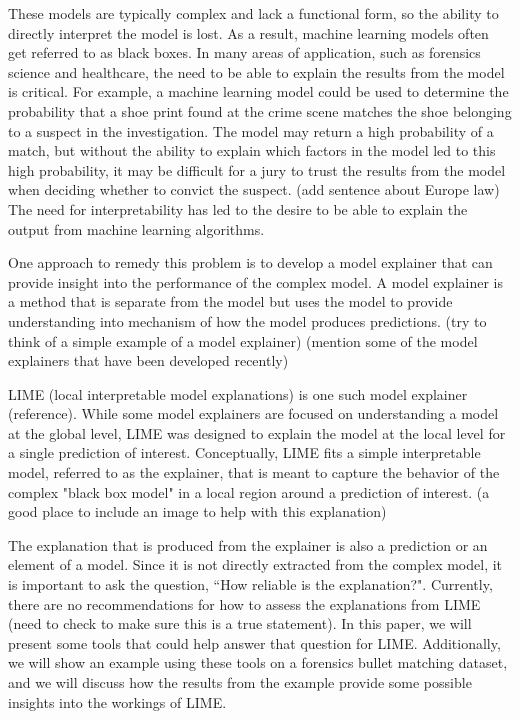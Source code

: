 \documentclass[AMS,STIX2COL]{WileyNJD-v2}
\begin{document}
These models are typically complex and lack a functional form, so the ability to directly interpret the model is lost. As a result, machine learning models often get referred to as black boxes. In many areas of application, such as forensics science and healthcare, the need to be able to explain the results from the model is critical. For example, a machine learning model could be used to determine the probability that a shoe print found at the crime scene matches the shoe belonging to a suspect in the investigation. The model may return a high probability of a match, but without the ability to explain which factors in the model led to this high probability, it may be difficult for a jury to trust the results from the model when deciding whether to convict the suspect. (add sentence about Europe law) The need for interpretability has led to the desire to be able to explain the output from machine learning algorithms.

One approach to remedy this problem is to develop a model explainer that can provide insight into the performance of the complex model. A model explainer is a method that is separate from the model but uses the model to provide understanding into mechanism of how the model produces predictions. (try to think of a simple example of a model explainer) (mention some of the model explainers that have been developed recently)

LIME (local interpretable model explanations) is one such model explainer (reference). While some model explainers are focused on understanding a model at the global level, LIME was designed to explain the model at the local level for a single prediction of interest. Conceptually, LIME fits a simple interpretable model, referred to as the explainer, that is meant to capture the behavior of the complex "black box model" in a local region around a prediction of interest. (a good place to include an image to help with this explanation)

The explanation that is produced from the explainer is also a prediction or an element of a model. Since it is not directly extracted from the complex model, it is important to ask the question, ``How reliable is the explanation?". Currently, there are no recommendations for how to assess the explanations from LIME (need to check to make sure this is a true statement). In this paper, we will present some tools that could help answer that question for LIME. Additionally, we will show an example using these tools on a forensics bullet matching dataset, and we will discuss how the results from the example provide some possible insights into the workings of LIME.
\end{document}
